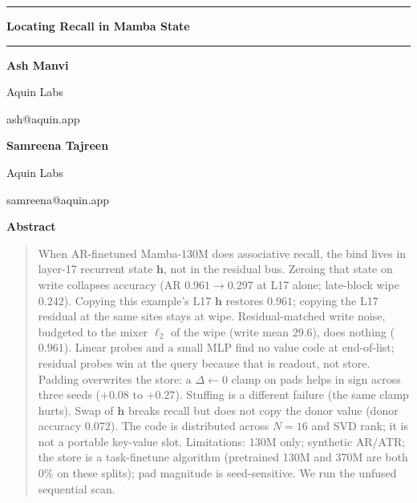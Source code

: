 \documentclass[11pt]{article}
\begin{document}
\thispagestyle{empty}
\vspace*{0.5cm}

\noindent\rule{\textwidth}{2pt}

\vspace{0.45cm}
\begin{center}
  {\LARGE\bfseries Locating Recall in Mamba State}
\end{center}
\vspace{0.35cm}

\noindent\rule{\textwidth}{0.8pt}

\vspace{0.6cm}

\begin{center}
\begin{minipage}[t]{0.3\textwidth}
\centering
{\bfseries Ash Manvi}\par
Aquin Labs\par
{\ttfamily ash@aquin.app}
\end{minipage}
\hfill
\begin{minipage}[t]{0.3\textwidth}
\centering
{\bfseries Samreena Tajreen}\par
Aquin Labs\par
{\ttfamily samreena@aquin.app}
\end{minipage}
\end{center}

\vspace{0.55cm}

\begin{center}
  {\Large\bfseries Abstract}
\end{center}

\begin{quote}
When AR-finetuned Mamba-130M does associative recall, the bind lives in
layer-17 recurrent state $\mathbf{h}$, not in the residual bus.
Zeroing that state on write collapses accuracy (AR $0.961 \to 0.297$ at
L17 alone; late-block wipe $0.242$).
Copying this example's L17 $\mathbf{h}$ restores $0.961$; copying the
L17 residual at the same sites stays at wipe.
Residual-matched write noise, budgeted to the mixer $\ell_2$ of the wipe
(write mean $29.6$), does nothing ($0.961$).
Linear probes and a small MLP find no value code at end-of-list;
residual probes win at the query because that is readout, not store.
Padding overwrites the store: a $\Delta \leftarrow 0$ clamp on pads helps
in sign across three seeds ($+0.08$ to $+0.27$).
Stuffing is a different failure (the same clamp hurts).
Swap of $\mathbf{h}$ breaks recall but does not copy the donor value
(donor accuracy $0.072$).
The code is distributed across $N=16$ and SVD rank; it is not a portable
key-value slot.
Limitations: 130M only; synthetic AR/ATR; the store is a task-finetune
algorithm (pretrained 130M and 370M are both $0\%$ on these splits);
pad magnitude is seed-sensitive. We run the unfused sequential scan.
\end{quote}
\end{document}
